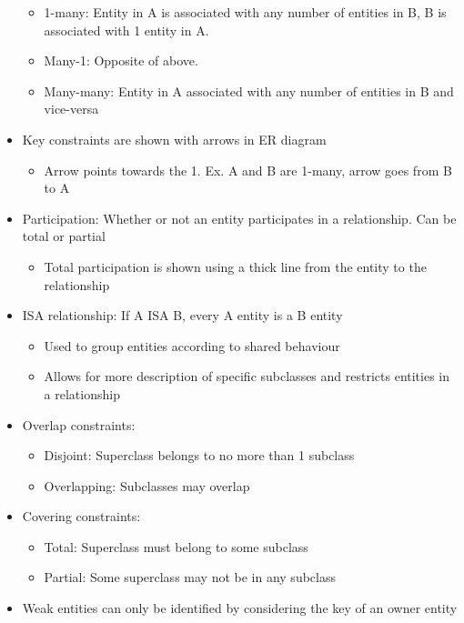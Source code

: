 \documentclass[8pt,landscape,a4paper, fleqn, dvipsnames]{extarticle}
\begin{document}
\begin{multicols*}{4}
\begin{itemize}
\begin{itemize}
        \item 1-many: Entity in A is associated with any number of entities in B, B is associated with 1 entity in A.
        \item Many-1: Opposite of above.
        \item Many-many: Entity in A associated with any number of entities in B and vice-versa
    \end{itemize}
    \item Key constraints are shown with arrows in ER diagram
    \begin{itemize}
        \item Arrow points towards the 1. Ex. A and B are 1-many, arrow goes from B to A
    \end{itemize}
    \item Participation: Whether or not an entity participates in a relationship. Can be total or partial
    \begin{itemize}
        \item Total participation is shown using a thick line from the entity to the relationship
    \end{itemize}
    \item ISA relationship: If A ISA B, every A entity is a B entity
    \begin{itemize}
        \item Used to group entities according to shared behaviour
        \item Allows for more description of specific subclasses and restricts entities in a relationship
    \end{itemize}
    \item Overlap constraints:
    \begin{itemize}
        \item Disjoint: Superclass belongs to no more than 1 subclass
        \item Overlapping: Subclasses may overlap
    \end{itemize}
    \item Covering constraints:
    \begin{itemize}
        \item Total: Superclass must belong to some subclass
        \item Partial: Some superclass may not be in any subclass
    \end{itemize}
    \item Weak entities can only be identified by considering the key of an owner entity
    \begin{itemize}

\end{itemize}
\end{itemize}
\end{multicols*}
\end{document}
